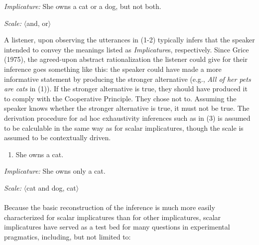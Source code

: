 \documentclass[man]{apa6}
\providecommand{\tightlist}{%
  \setlength{\itemsep}{0pt}\setlength{\parskip}{0pt}}
\theoremstyle{definition}
\theoremstyle{definition}
\theoremstyle{definition}
\theoremstyle{remark}
\begin{document}
\emph{Implicature:} She owns a cat or a dog, but not both.

\emph{Scale:} $\langle$and, or$\rangle$

A listener, upon observing the utterances in (1-2) typically infers
that the speaker intended to convey the meanings listed as \emph{Implicature}s,
respectively. Since Grice (1975), the agreed-upon abstract
rationalization the listener could give for their inference goes
something like this: the speaker could have made a more informative
statement by producing the stronger alternative (e.g., \emph{All of her
pets are cats} in (1)). If the stronger alternative is true, they
should have produced it to comply with the Cooperative Principle. They
chose not to. Assuming the speaker knows whether the stronger
alternative is true, it must not be true. The derivation
procedure for ad hoc exhaustivity inferences such as in (3) is assumed to
be calculable in the same way as for scalar implicatures, though the
scale is assumed to be contextually driven.

\begin{enumerate}
\def\labelenumi{(\arabic{enumi})}
\setcounter{enumi}{2}
\tightlist
\item
  She owns a cat.
\end{enumerate}

\emph{Implicature:} She owns only a cat.

\emph{Scale:} $\langle$cat and dog, cat$\rangle$\\
~\\

Because the basic reconstruction of the inference is much more easily
characterized for scalar implicatures than for other implicatures,
scalar implicatures have served as a test bed for many questions in
experimental pragmatics, including, but not limited to:
\end{document}
